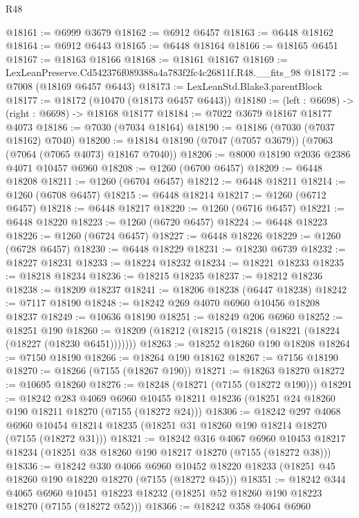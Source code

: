 \begin{lexlean}{R48}
\begin{coremodule}
@18161 := @6999 @3679
@18162 := @6912 @6457
@18163 := @6448 @18162
@18164 := @6912 @6443
@18165 := @6448 @18164
@18166 := @18165 @6451
@18167 := @18163 @18166
@18168 := @18161 @18167
@18169 := LexLeanPreserve.Cd542376f089388a4a783f2fc4c26811f.R48.__fits_98
@18172 := @7008 (@18169 @6457 @6443)
@18173 := LexLeanStd.Blake3.parentBlock
@18177 := @18172 (@10470 (@18173 @6457 @6443))
@18180 := (left : @6698) -> (right : @6698) -> @18168 @18177
@18184 := @7022 @3679 @18167 @18177 @4073
@18186 := @7030 (@7034 @18164)
@18190 := @18186 (@7030 (@7037 @18162) @7040)
@18200 := @18184 @18190 (@7047 (@7057 @3679)) (@7063 (@7064 (@7065 @4073) @18167 @7040))
@18206 := @8000 @18190 @2036 @2386 @4071 @10457 @6960
@18208 := @1260 (@6700 @6457)
@18209 := @6448 @18208
@18211 := @1260 (@6704 @6457)
@18212 := @6448 @18211
@18214 := @1260 (@6708 @6457)
@18215 := @6448 @18214
@18217 := @1260 (@6712 @6457)
@18218 := @6448 @18217
@18220 := @1260 (@6716 @6457)
@18221 := @6448 @18220
@18223 := @1260 (@6720 @6457)
@18224 := @6448 @18223
@18226 := @1260 (@6724 @6457)
@18227 := @6448 @18226
@18229 := @1260 (@6728 @6457)
@18230 := @6448 @18229
@18231 := @18230 @6739
@18232 := @18227 @18231
@18233 := @18224 @18232
@18234 := @18221 @18233
@18235 := @18218 @18234
@18236 := @18215 @18235
@18237 := @18212 @18236
@18238 := @18209 @18237
@18241 := @18206 @18238 (@6447 @18238)
@18242 := @7117 @18190
@18248 := @18242 @269 @4070 @6960 @10456 @18208 @18237
@18249 := @10636 @18190
@18251 := @18249 @206 @6960
@18252 := @18251 @190
@18260 := @18209 (@18212 (@18215 (@18218 (@18221 (@18224 (@18227 (@18230 @6451)))))))
@18263 := @18252 @18260 @190 @18208
@18264 := @7150 @18190
@18266 := @18264 @190 @18162
@18267 := @7156 @18190
@18270 := @18266 (@7155 (@18267 @190))
@18271 := @18263 @18270
@18272 := @10695 @18260
@18276 := @18248 (@18271 (@7155 (@18272 @190)))
@18291 := @18242
    @283
    @4069
    @6960
    @10455
    @18211
    @18236
    (@18251 @24 @18260 @190 @18211 @18270 (@7155 (@18272 @24)))
@18306 := @18242
    @297
    @4068
    @6960
    @10454
    @18214
    @18235
    (@18251 @31 @18260 @190 @18214 @18270 (@7155 (@18272 @31)))
@18321 := @18242
    @316
    @4067
    @6960
    @10453
    @18217
    @18234
    (@18251 @38 @18260 @190 @18217 @18270 (@7155 (@18272 @38)))
@18336 := @18242
    @330
    @4066
    @6960
    @10452
    @18220
    @18233
    (@18251 @45 @18260 @190 @18220 @18270 (@7155 (@18272 @45)))
@18351 := @18242
    @344
    @4065
    @6960
    @10451
    @18223
    @18232
    (@18251 @52 @18260 @190 @18223 @18270 (@7155 (@18272 @52)))
@18366 := @18242
    @358
    @4064
    @6960

\end{coremodule}
\end{lexlean}
